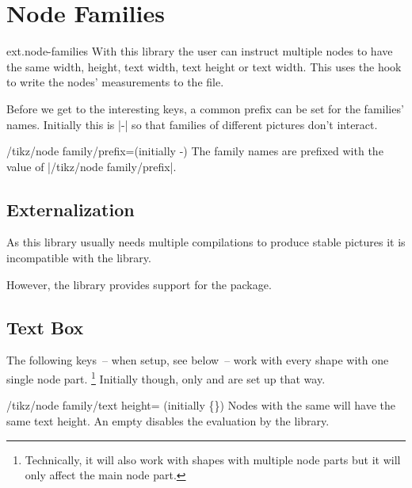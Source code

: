 %
%
%
\section{Node Families}
\begin{tikzlibrary}{ext.node-families}
  With this library the user can instruct multiple nodes to have the same
  width, height, text width, text height or text width.
  This uses the hook  to write the nodes'
  measurements to the  file.
  
\end{tikzlibrary}

Before we get to the interesting keys, a common prefix can be set for the families' names.
Initially this is |\pgfpictureid-| so that families of different pictures don't interact.
\begin{key}{/tikz/node family/prefix=(initially \string\pgfpictureid-)}
The family names are prefixed with the value of |/tikz/node family/prefix|.
\end{key}

\subsection{Externalization}
As this library usually needs multiple compilations
to produce stable pictures it is incompatible
with the  library.

However, the library provides support for the
 \cite{memoize} package.
\subsection{Text Box}
\label{ssec:nf-text}
The following keys~-- when setup, see below~-- work with every shape with one single node part.%
\footnote{Technically, it will also work with shapes with multiple node parts but it will only affect the main node part.}
Initially though, only  and  are set up that way.
\begin{key}{/tikz/node family/text height= (initially \{\})}
Nodes with the same  will have the same text height.
An empty  disables the evaluation by the library.
\end{key}


